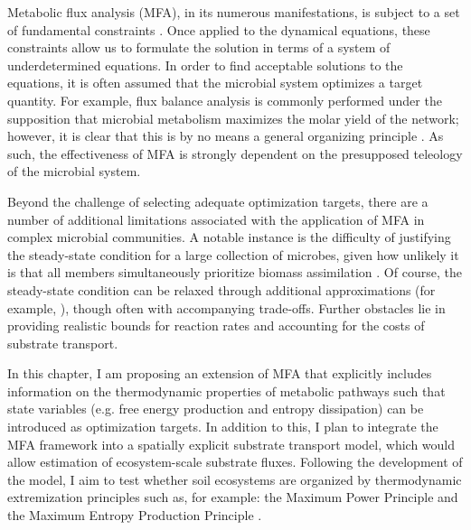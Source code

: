 
Metabolic flux analysis (MFA), in its numerous manifestations, is subject to a set of fundamental constraints \cite{kooijman1998a, kleerebezem2010a}. Once applied to the dynamical equations, these constraints allow us to formulate the solution in terms of a system of underdetermined equations. In order to find acceptable solutions to the equations, it is often assumed that the microbial system optimizes a target quantity. For example, flux balance analysis is commonly performed under the supposition that microbial metabolism maximizes the molar yield of the network; however, it is clear that this is by no means a general organizing principle \cite{schuster_is_2008}. As such, the effectiveness of MFA is strongly dependent on the presupposed teleology of the microbial system. 


Beyond the challenge of selecting adequate optimization targets, there are a number of additional limitations associated with the application of MFA in complex microbial communities. A notable instance is the difficulty of justifying the steady-state condition for a large collection of microbes, given how unlikely it is that all members simultaneously prioritize biomass assimilation \cite{harcombe_metabolic_2014}. Of course, the steady-state condition can be relaxed through additional approximations (for example, \cite{khandelwal_community_2013, manhart_growth_2018}), though often with accompanying trade-offs. Further obstacles lie in providing realistic bounds for reaction rates and accounting for the costs of substrate transport. 


In this chapter, I am proposing an extension of MFA that explicitly includes information on the thermodynamic properties of metabolic pathways such that state variables (e.g. free energy production and entropy dissipation) can be introduced as optimization targets. In addition to this, I plan to integrate the MFA framework into a spatially explicit substrate transport model, which would allow estimation of ecosystem-scale substrate fluxes. Following the development of the model, I aim to test whether soil ecosystems are organized by thermodynamic extremization principles such as, for example: the Maximum Power Principle \cite{odum_times_1955} and the Maximum Entropy Production Principle \cite{martyushev_maximum_2006}. 

